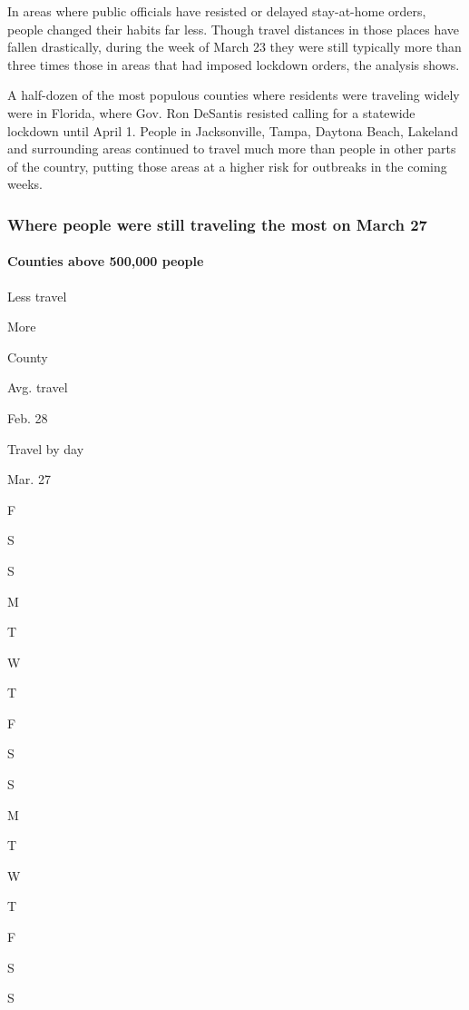 In areas where public officials have resisted or delayed stay-at-home
orders, people changed their habits far less. Though travel distances in
those places have fallen drastically, during the week of March 23 they
were still typically more than three times those in areas that had
imposed lockdown orders, the analysis shows.

A half-dozen of the most populous counties where residents were
traveling widely were in Florida, where Gov. Ron DeSantis resisted
calling for a statewide lockdown until April 1. People in Jacksonville,
Tampa, Daytona Beach, Lakeland and surrounding areas continued to travel
much more than people in other parts of the country, putting those areas
at a higher risk for outbreaks in the coming weeks.

\hypertarget{where-people-were-still-traveling-the-most-on-march-27}{%
\subsubsection{Where people were still traveling the most on March
27}\label{where-people-were-still-traveling-the-most-on-march-27}}

\hypertarget{counties-above-500000-people}{%
\paragraph{Counties above 500,000
people}\label{counties-above-500000-people}}

Less travel

More

County

Avg. travel

Feb. 28

Travel by day

Mar. 27

F

S

S

M

T

W

T

F

S

S

M

T

W

T

F

S

S

